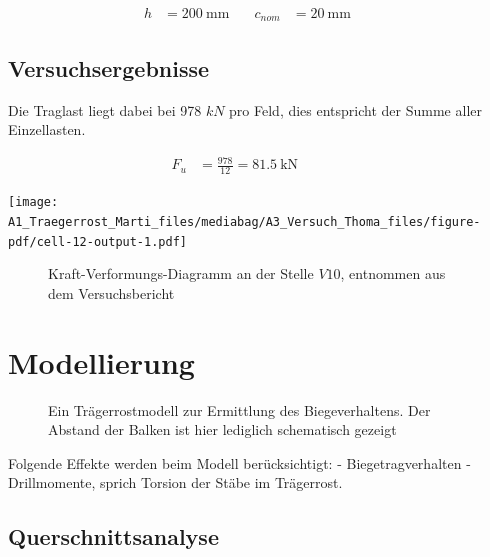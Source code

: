 \documentclass[
  11pt,
  letterpaper,
]{scrreprt}
\begin{document}
\[
\begin{aligned}
h& = 200 \ \mathrm{mm} \quad & c_{nom}& = 20 \ \mathrm{mm} \quad &  
 \end{aligned}
\]

\subsection{Versuchsergebnisse}\label{versuchsergebnisse}

Die Traglast liegt dabei bei 978 \(kN\) pro Feld, dies entspricht der
Summe aller Einzellasten.

\[
\begin{aligned}
F_{u}& = \frac{978}{12} = 81.5 \ \mathrm{kN} \quad &  \quad &  
 \end{aligned}
\]

\texttt{[image: A1\_Traegerrost\_Marti\_files/mediabag/A3\_Versuch\_Thoma\_files/figure-pdf/cell-12-output-1.pdf]}

\begin{figure}[H]


\caption{\label{fig-tho_res_V10}Kraft-Verformungs-Diagramm an der Stelle
\(V10\), entnommen aus dem Versuchsbericht}

\end{figure}%

\section{Modellierung}\label{modellierung-2}

\begin{figure}[H]


\caption{\label{fig-tho_rost_iso}Ein Trägerrostmodell zur Ermittlung des
Biegeverhaltens. Der Abstand der Balken ist hier lediglich schematisch
gezeigt}

\end{figure}%

Folgende Effekte werden beim Modell berücksichtigt: - Biegetragverhalten
- Drillmomente, sprich Torsion der Stäbe im Trägerrost.

\subsection{Querschnittsanalyse}\label{querschnittsanalyse}
\end{document}
